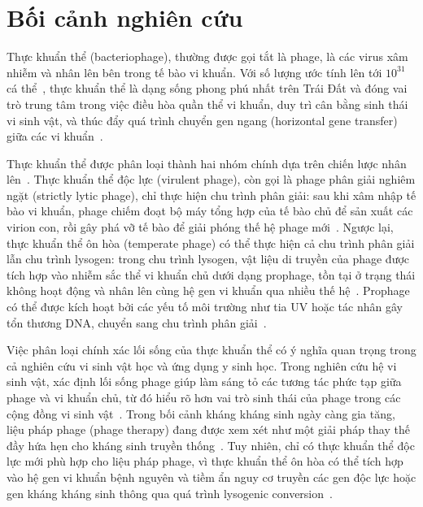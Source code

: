 \section{Bối cảnh nghiên cứu}
\label{sec:background}

Thực khuẩn thể (bacteriophage), thường được gọi tắt là phage, là các virus xâm nhiễm và nhân lên bên trong tế bào vi khuẩn. Với số lượng ước tính lên tới $10^{31}$ cá thể~\cite{suttle2007marine}, thực khuẩn thể là dạng sống phong phú nhất trên Trái Đất và đóng vai trò trung tâm trong việc điều hòa quần thể vi khuẩn, duy trì cân bằng sinh thái vi sinh vật, và thúc đẩy quá trình chuyển gen ngang (horizontal gene transfer) giữa các vi khuẩn~\cite{koskella2014bacteria}.

Thực khuẩn thể được phân loại thành hai nhóm chính dựa trên chiến lược nhân lên~\cite{wu2021deephage}. Thực khuẩn thể độc lực (virulent phage), còn gọi là phage phân giải nghiêm ngặt (strictly lytic phage), chỉ thực hiện chu trình phân giải: sau khi xâm nhập tế bào vi khuẩn, phage chiếm đoạt bộ máy tổng hợp của tế bào chủ để sản xuất các virion con, rồi gây phá vỡ tế bào để giải phóng thế hệ phage mới~\cite{mcnair2012phacts}. Ngược lại, thực khuẩn thể ôn hòa (temperate phage) có thể thực hiện cả chu trình phân giải lẫn chu trình lysogen: trong chu trình lysogen, vật liệu di truyền của phage được tích hợp vào nhiễm sắc thể vi khuẩn chủ dưới dạng prophage, tồn tại ở trạng thái không hoạt động và nhân lên cùng hệ gen vi khuẩn qua nhiều thế hệ~\cite{howard2017lysogeny}. Prophage có thể được kích hoạt bởi các yếu tố môi trường như tia UV hoặc tác nhân gây tổn thương DNA, chuyển sang chu trình phân giải~\cite{feiner2015new}.

Việc phân loại chính xác lối sống của thực khuẩn thể có ý nghĩa quan trọng trong cả nghiên cứu vi sinh vật học và ứng dụng y sinh học. Trong nghiên cứu hệ vi sinh vật, xác định lối sống phage giúp làm sáng tỏ các tương tác phức tạp giữa phage và vi khuẩn chủ, từ đó hiểu rõ hơn vai trò sinh thái của phage trong các cộng đồng vi sinh vật~\cite{shang2023phatyp}. Trong bối cảnh kháng kháng sinh ngày càng gia tăng, liệu pháp phage (phage therapy) đang được xem xét như một giải pháp thay thế đầy hứa hẹn cho kháng sinh truyền thống~\cite{gorski2016phage,azimi2019phage}. Tuy nhiên, chỉ có thực khuẩn thể độc lực mới phù hợp cho liệu pháp phage, vì thực khuẩn thể ôn hòa có thể tích hợp vào hệ gen vi khuẩn bệnh nguyên và tiềm ẩn nguy cơ truyền các gen độc lực hoặc gen kháng kháng sinh thông qua quá trình lysogenic conversion~\cite{cobian2016viruses}.

